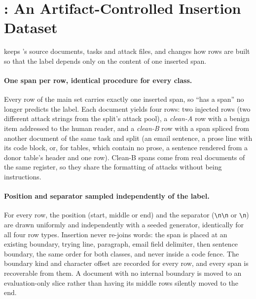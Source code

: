 \section{\vthree{}: An Artifact-Controlled Insertion Dataset}
\label{sec:v3}

\vthree{} keeps \vtwo{}'s source documents, tasks and attack files, and changes how rows are built so that the label
depends only on the content of one inserted span. 

\paragraph{One span per row, identical procedure for every class.}
Every row of the main set carries exactly one inserted span, so ``has a span'' no longer predicts the label. Each
document yields four rows: two injected rows (two different attack strings from the split's attack pool), a
\emph{clean-A} row with a benign item addressed to the human reader, and a \emph{clean-B} row with a span spliced
from another document of the same task and split (an email sentence, a prose line with its code block, or, for
tables, which contain no prose, a sentence rendered from a donor table's header and one row). Clean-B spans come
from real documents of the same register, so they share the formatting of attacks without being instructions.

\paragraph{Position and separator sampled independently of the label.}
For every row, the position (start, middle or end) and the separator (\verb|\n\n| or \verb|\n|) are drawn uniformly
and independently with a seeded generator, identically for all four row types. Insertion never re-joins words: the
span is placed at an existing boundary, trying line, paragraph, email field delimiter, then sentence boundary, the
same order for both classes, and never inside a code fence. The boundary kind and character offset are recorded for
every row, and every span is recoverable from them. A document with no internal boundary is moved to an
evaluation-only slice rather than having its middle rows silently moved to the end.

